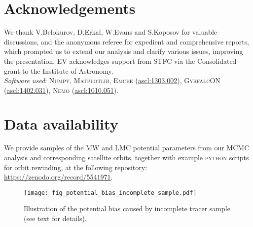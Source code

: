 \documentclass[usenatbib,fleqn]{mnras}
\begin{document}
\section*{Acknowledgements}
We thank V.Belokurov, D.Erkal, W.Evans and S.Koposov for valuable discussions, and the anonymous referee for expedient and comprehensive reports, which prompted us to extend our analysis and clarify various issues, improving the presentation. EV acknowledges support from STFC via the Consolidated grant to the Institute of Astronomy.\\
\textit{Software used}: \textsc{Numpy}, \textsc{Matplotlib}, \textsc{Emcee} (\href{http://ascl.net/1303.002}{ascl:1303.002}), \textsc{GyrfalcON} (\href{http://ascl.net/1402.031}{ascl:1402.031}), \textsc{Nemo} (\href{http://ascl.net/1010.051}{ascl:1010.051}).

\section*{Data availability}
We provide samples of the MW and LMC potential parameters from our MCMC analysis and corresponding satellite orbits, together with example \textsc{python} scripts for orbit rewinding, at the following repository: \url{https://zenodo.org/record/5541971}.

\appendix

\begin{figure*}
\texttt{[image: fig\_potential\_bias\_incomplete\_sample.pdf]}
\caption{Illustration of the potential bias caused by incomplete tracer sample (see text for details).
}  \label{fig:potential_bias_incomplete_sample}
\end{figure*}
\end{document}
